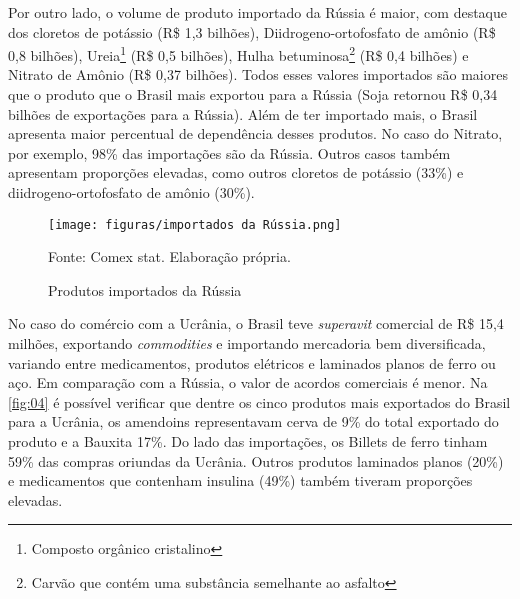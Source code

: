 \documentclass[
article, %
12pt, %
oneside, %
a4paper, %
portuguese, %
portuguese %
]{abntex2}
\begin{document}
Por outro lado, o volume de produto importado da Rússia é maior, com destaque dos cloretos de potássio (R\$ 1,3 bilhões), Diidrogeno-ortofosfato de amônio (R\$ 0,8 bilhões), Ureia\footnote{Composto orgânico cristalino} (R\$ 0,5 bilhões), Hulha betuminosa\footnote{Carvão que contém uma substância semelhante ao asfalto} (R\$ 0,4 bilhões) e Nitrato de Amônio (R\$ 0,37 bilhões). Todos esses valores importados são maiores que o produto que o Brasil mais exportou para a Rússia (Soja retornou R\$ 0,34 bilhões de exportações para a Rússia). Além de ter importado mais, o Brasil apresenta maior percentual de dependência desses produtos. No caso do Nitrato, por exemplo, 98\% das importações são da Rússia. Outros casos também apresentam proporções elevadas, como outros cloretos de potássio (33\%) e diidrogeno-ortofosfato de amônio (30\%).

\begin{figure}
    \centering
    \caption{Produtos importados da Rússia}
    \texttt{[image: figuras/importados da Rússia.png]}
    \begin{flushleft}
    Fonte: Comex stat. Elaboração própria.
    \end{flushleft}
    \label{fig:03}
\end{figure}

No caso do comércio com a Ucrânia, o Brasil teve \textit{superavit} comercial de R\$ 15,4 milhões, exportando \textit{commodities} e importando mercadoria bem diversificada, variando entre medicamentos, produtos elétricos e laminados planos de ferro ou aço. Em comparação com a Rússia, o valor de acordos comerciais é menor. Na \autoref{fig:04} é possível verificar que dentre os cinco produtos mais exportados do Brasil para a Ucrânia, os amendoins representavam cerva de 9\% do total exportado do produto e a Bauxita 17\%. Do lado das importações, os Billets de ferro tinham 59\% das compras oriundas da Ucrânia. Outros produtos laminados planos (20\%) e medicamentos que contenham insulina (49\%) também tiveram proporções elevadas.




\end{document}
